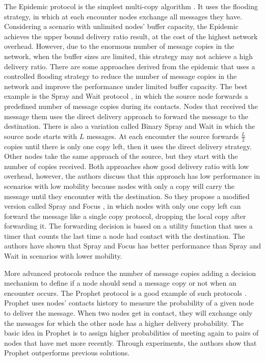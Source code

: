 The Epidemic protocol is the simplest multi-copy algorithm \citep{vahdat2000epidemic}. It uses the flooding strategy, in which at each encounter nodes exchange all messages they have.
Considering a scenario with unlimited nodes' buffer capacity, the Epidemic achieves the upper bound delivery ratio result, at the cost of the highest network overhead. However, due to the enormous number of message copies in the network, when the buffer sizes are limited, this strategy may not achieve a high delivery ratio.
There are some approaches derived from the epidemic that uses a controlled flooding strategy to reduce the number of message copies in the network and improve the performance under limited buffer capacity. The best example is the Spray and Wait protocol \citep{spyropoulos2005spray}, in which the source node forwards a predefined number of message copies during its contacts. Nodes that received the message them uses the direct delivery approach to forward the message to the destination. There is also a variation called Binary Spray and Wait \citep{spyropoulos2005spray} in which the source node starts with $L$ messages. At each encounter the source forwards $\frac{L}{2}$ copies until there is only one copy left, then it uses the direct delivery strategy. Other nodes take the same approach of the source, but they start with the number of copies received. Both approaches show good delivery ratio with low overhead, however, the authors discuss that this approach has low performance in scenarios with low mobility because nodes with only a copy will carry the message until they encounter with the destination. So they propose a modified version called Spray and Focus \citep{spyropoulos2007spray}, in which nodes with only one copy left can forward the message like a single copy protocol, dropping the local copy after forwarding it. The forwarding decision is based on a utility function that uses a timer that counts the last time a node had contact with the destination. The authors have shown that Spray and Focus has better performance than Spray and Wait in scenarios with lower mobility.

More advanced protocols reduce the number of message copies adding a decision mechanism to define if a node should send a message copy or not when an encounter occurs. The Prophet protocol is a good example of such protocols \citep{lindgren2003probabilistic}. Prophet uses nodes' contacts history to measure the probability of a given node to deliver the message. When two nodes get in contact, they will exchange only the messages for which the other node has a higher delivery probability. The basic idea in Prophet is to assign higher probabilities of meeting again to pairs of nodes that have met more recently. Through experiments, the authors show that Prophet outperforms previous solutions.

